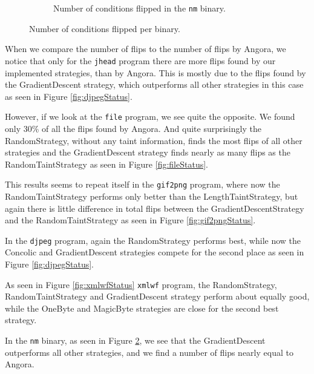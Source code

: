 \begin{figure}[H]
\begin{subfigure}[b]{0.49\textwidth}
        \caption{Number of conditions flipped in the \texttt{nm} binary.}
        \label{fig:nmStatus}
    \end{subfigure}
    \caption{Number of conditions flipped per binary.}
\end{figure}
When we compare the number of flips to the number of flips by Angora, we notice that only for the \texttt{jhead} program there are more flips found by our implemented strategies, than by Angora. This is mostly due to the flips found by the GradientDescent strategy, which outperforms all other strategies in this case as seen in Figure \ref{fig:djpegStatus}.

However, if we look at the \texttt{file} program, we see quite the opposite. We found only 30\% of all the flips found by Angora. And quite surprisingly the RandomStrategy, without any taint information, finds the most flips of all other strategies and the GradientDescent strategy finds nearly as many flips as the RandomTaintStrategy as seen in Figure \ref{fig:fileStatus}. 

This results seems to repeat itself in the \texttt{gif2png} program, where now the RandomTaintStrategy performs only better than the LengthTaintStrategy, but again there is little difference in total flips between the GradientDescentStrategy and the RandomTaintStrategy as seen in Figure \ref{fig:gif2pngStatus}.


In the \texttt{djpeg} program, again the RandomStrategy performs best, while now the Concolic and GradientDescent strategies compete for the second place as seen in Figure \ref{fig:djpegStatus}.

As seen in Figure \ref{fig:xmlwfStatus} \texttt{xmlwf} program, the RandomStrategy, RandomTaintStrategy and GradientDescent strategy perform about equally good, while the OneByte and MagicByte strategies are close for the second best strategy.

In the \texttt{nm} binary, as seen in Figure \ref{fig:nmStatus}, we see that the GradientDescent outperforms all other strategies, and we find a number of flips nearly equal to Angora.



